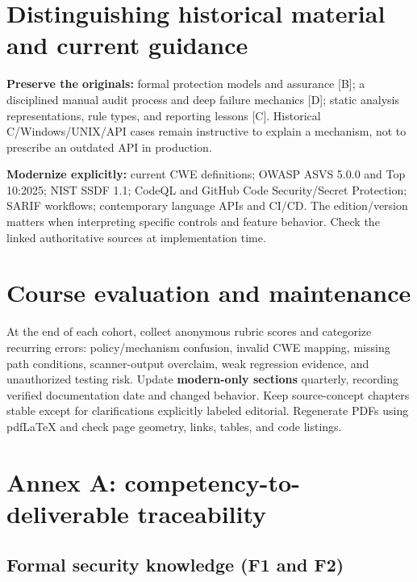 \documentclass[
  letterpaper,
]{article}
\begin{document}
\section{Distinguishing historical material and current
guidance}\label{distinguishing-historical-material-and-current-guidance}

\textbf{Preserve the originals:} formal protection models and assurance
{[}B{]}; a disciplined manual audit process and deep failure mechanics
{[}D{]}; static analysis representations, rule types, and reporting
lessons {[}C{]}. Historical C/Windows/UNIX/API cases remain instructive
to explain a mechanism, not to prescribe an outdated API in production.

\textbf{Modernize explicitly:} current CWE definitions; OWASP ASVS 5.0.0
and Top 10:2025; NIST SSDF 1.1; CodeQL and GitHub Code Security/Secret
Protection; SARIF workflows; contemporary language APIs and CI/CD. The
edition/version matters when interpreting specific controls and feature
behavior. Check the linked authoritative sources at implementation time.

\section{Course evaluation and
maintenance}\label{course-evaluation-and-maintenance}

At the end of each cohort, collect anonymous rubric scores and
categorize recurring errors: policy/mechanism confusion, invalid CWE
mapping, missing path conditions, scanner-output overclaim, weak
regression evidence, and unauthorized testing risk. Update
\textbf{modern-only sections} quarterly, recording verified
documentation date and changed behavior. Keep source-concept chapters
stable except for clarifications explicitly labeled editorial.
Regenerate PDFs using pdfLaTeX and check page geometry, links, tables,
and code listings.

\section{Annex A: competency-to-deliverable
traceability}\label{annex-a-competency-to-deliverable-traceability}

\subsection{Formal security knowledge (F1 and
F2)}\label{formal-security-knowledge-f1-and-f2}
\end{document}
